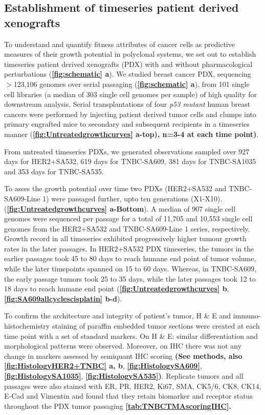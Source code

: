 \subsection{Establishment of timeseries patient derived xenografts}

To understand and quantify fitness attributes of cancer cells as  predictive measures of their growth potential in polyclonal systems, we set out to establish timeseries patient derived xenografts (PDX) with and without pharmacological perturbations (\textbf{\autoref{fig:schematic} a}). We studied breast cancer PDX, sequencing $>$123,106 genomes over serial passaging (\textbf{\autoref{fig:schematic} a}), from 101 single cell libraries (a median of 303 single cell genomes per sample) of high quality for downstream analysis. 
Serial transplantations of four \textit{p53 mutant} human breast cancers were performed by injecting patient derived tumor cells and clumps into primary engrafted mice to secondary and subsequent recipients in a timeseries manner (\textbf{\autoref{fig:Untreatedgrowthcurves} a-top), n=3-4 at each time point)}. 

From untreated timeseries PDXs, we generated observations sampled over 927 days for HER2+SA532, 619 days for TNBC-SA609, 381 days for TNBC-SA1035 and 353 days for TNBC-SA535. 

To asses the growth potential over time two PDXs (HER2+SA532 and TNBC-SA609-Line 1) were passaged further, upto ten generations (X1-X10).
 (\textbf{\autoref{fig:Untreatedgrowthcurves} a-Bottom}).
 A median of 907 single cell genomes were sequenced per passage for a total of 11,705 and 10,553 single cell genomes from the HER2+SA532 and TNBC-SA609-Line 1 series, respectively. 
Growth record in all timeseries exhibited progressively higher tumour growth rates in the later passages. In HER2+SA532 PDX timeseries, the tumors in the earlier passages took 45 to 80 days to reach humane end point of tumor volume, while the later timepoints spanned on 15 to 60 days. Whereas, in TNBC-SA609, the early passage tumors took 25 to 35 days, while the later passages took 12 to 18 days to reach humane end point (\textbf{\autoref{fig:Untreatedgrowthcurves} b}, \textbf{\autoref{fig:SA609allcyclescisplatin} b-d}).

To confirm the architecture and integrity of patient's tumor, H \& E and immuno-histochemistry staining of paraffin embedded tumor sections were created at each time point with a set of standard markers. On H \& E: similar differentiation and morphological patterns were observed. Moreover, on IHC there was not any change in markers assessed by semiquant IHC scoring \textbf{(See methods, also {\autoref{fig:HistologyHER2+TNBC}} a, b},  \textbf{\autoref{fig:HistologySA609}},  \textbf{\autoref{fig:HistologySA1035}}, \textbf{\autoref{fig:HistologySA535})}. 
Replicate tumors and all passages were also stained with ER, PR, HER2, Ki67, SMA, CK5/6, CK8, CK14, E-Cad and Vimentin and found that they retain biomarker and receptor status throughout the PDX tumor passaging \textbf{\autoref{tab:TNBCTMAscoringIHC}.}


